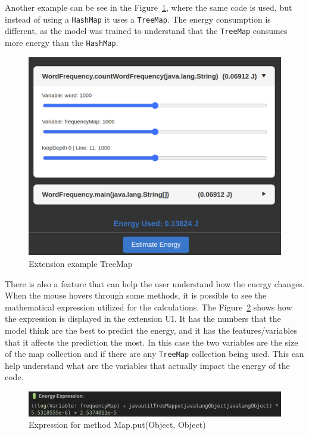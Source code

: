 Another example can be see in the Figure~\ref{fig:extension_example2}, where the same code is used, but instead of using a \texttt{HashMap} it uses a \texttt{TreeMap}. The energy consumption is different, as the model was trained to understand that the \texttt{TreeMap} consumes more energy than the \texttt{HashMap}.




\begin{figure}[htbp]
  \centering
  \includegraphics[width = .7 \textwidth]{figures/extension_example2.png}
  \caption{Extension example TreeMap}
  \label{fig:extension_example2}
\end{figure}

There is also a feature that can help the user understand how the energy changes. When the mouse hovers through some methods, it is possible to see the mathematical expression utilized for the calculations. The Figure~\ref{fig:extension_expression_example} shows how the expression is displayed in the extension UI. It has the numbers that the model think are the best to predict the energy, and it has the features/variables that it affects the prediction the most. In this case the two variables are the size of the map collection and if there are any \texttt{TreeMap} collection being used. This can help understand what are the variables that actually impact the energy of the code. 


\begin{figure}[htbp]
  \centering
  \includegraphics[width = .8 \textwidth]{figures/extension_expression_example.png}
  \caption{Expression for method Map.put(Object, Object)}
  \label{fig:extension_expression_example}
\end{figure}


